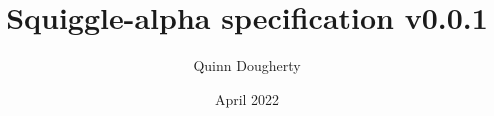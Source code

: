 \documentclass{article}
\title{Squiggle-alpha specification v0.0.1}
\author{Quinn Dougherty}
\date{April 2022}
\begin{document}
\maketitle{}

\nocite{*}




\printbibliography
\end{document}
